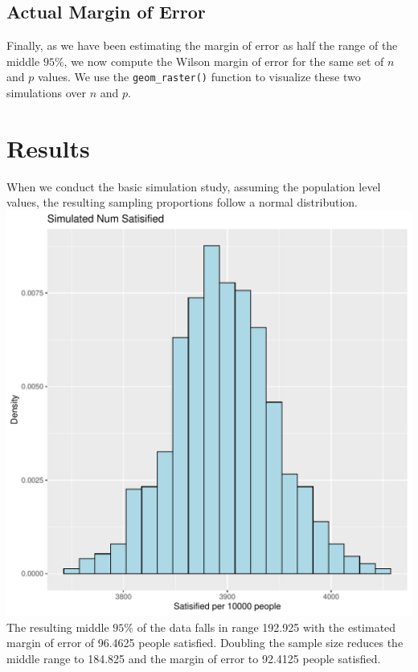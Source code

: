 \documentclass{article}\usepackage[]{graphicx}\usepackage[]{xcolor}
\makeatletter
\def\maxwidth{ %
  \ifdim\Gin@nat@width>\linewidth
    \linewidth
  \else
    \Gin@nat@width
  \fi
}
\newenvironment{knitrout}{}{} %
\makeatother
\begin{document}
\begin{multicols}{2}
\subsection{Actual Margin of Error}
Finally, as we have been estimating the margin of error as half the range of the middle $95\%$, we now compute the Wilson margin of error for the same set of $n$ and $p$ values. We use the \texttt{geom\_raster()} function to visualize these two simulations over $n$ and $p$.

\section{Results}
When we conduct the basic simulation study, assuming the population level values, the resulting sampling proportions follow a normal distribution.
\begin{knitrout}\scriptsize
{}\color{fgcolor}
\includegraphics[width=\maxwidth]{figure/unnamed-chunk-1-1} 
\end{knitrout}
The resulting middle $95\%$ of the data falls in range 192.925 with the estimated margin of error of 96.4625 people satisfied. Doubling the sample size reduces the middle range to 184.825 and the margin of error to 92.4125 people satisfied. 


\end{multicols}
\end{document}
